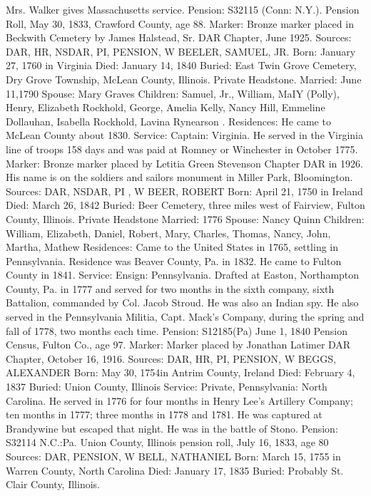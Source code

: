 Mrs. Walker gives Massachusetts service. 
Pension: S32115 (Conn: N.Y.). Pension Roll, May 30, 1833, Crawford County, age 88. Marker: Bronze marker placed in Beckwith Cemetery by James Halstead, Sr. DAR Chapter, June 1925. 
Sources: DAR, HR, NSDAR, PI, PENSION, W 
BEELER, SAMUEL, JR. 
Born: January 27, 1760 in Virginia 
Died: January 14, 1840 
Buried: East Twin Grove Cemetery, Dry Grove Township, McLean County, Illinois. Private Headstone. 
Married: June 11,1790 
Spouse: Mary Graves 
Children: Samuel, Jr., William, MaIY (Polly), Henry, Elizabeth Rockhold, George, Amelia Kelly, Nancy Hill, Emmeline Dollauhan, Isabella Rockhold, Lavina Rynearson . 
Residences: He came to McLean County about 1830. 
Service: Captain: Virginia. He served in the Virginia line of troops 158 days and was paid at Romney or Winchester in October 1775. 
Marker: Bronze marker placed by Letitia Green Stevenson Chapter DAR in 1926. His name is on the soldiers and sailors monument in Miller Park, Bloomington. 
Sources: DAR, NSDAR, PI , W 
BEER, ROBERT 
Born: April 21, 1750 in Ireland 
Died: March 26, 1842 
Buried: Beer Cemetery, three miles west of Fairview, Fulton County, Illinois. 
Private Headstone 
Married: 1776 
Spouse: Nancy Quinn 
Children: William, Elizabeth, Daniel, Robert, Mary, Charles, Thomas, Nancy, John, Martha, Mathew 
Residences: Came to the United States in 1765, settling in Pennsylvania. Resi­dence was Beaver County, Pa. in 1832. He came to Fulton County in 1841. 
Service: Ensign: Pennsylvania. Drafted at Easton, Northampton County, Pa. in 1777 and served for two months in the sixth company, sixth Battalion, com­manded by Col. Jacob Stroud. He was also an Indian spy. He also served in the Pennsylvania Militia, Capt. Mack's Company, during the spring and fall of 1778, two months each time. 
Pension: S12185(Pa) June 1, 1840 Pension Census, Fulton Co., age 97. 
Marker: Marker placed by Jonathan Latimer DAR Chapter, October 16, 1916. 
Sources: DAR, HR, PI, PENSION, W 
BEGGS, ALEXANDER 
Born: May 30, 1754in Antrim County, Ireland 
Died: February 4, 1837 
Buried: Union County, Illinois 
Service: Private, Pennsylvania: North Carolina. He served in 1776 for four months in Henry Lee's Artillery Company; ten months in 1777; three months in 1778 and 1781. He was captured at Brandywine but escaped that night. He was in the battle of Stono. 
Pension: S32114 N.C.:Pa. Union County, Illinois pension roll, July 16, 1833, age 80 
Sources: DAR, PENSION, W 
BELL, NATHANIEL 
Born: March 15, 1755 in Warren County, North Carolina 
Died: January 17, 1835 
Buried: Probably St. Clair County, Illinois. 
